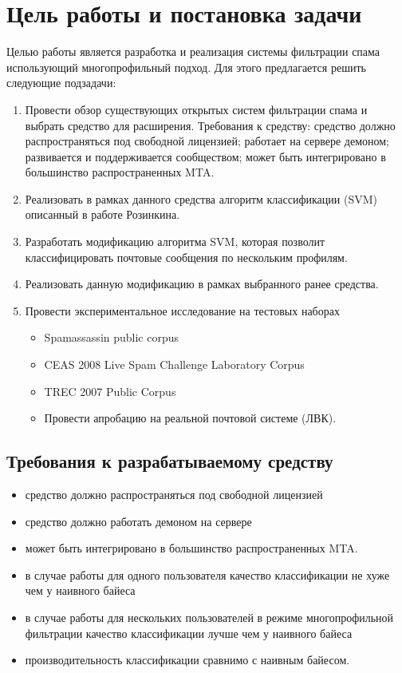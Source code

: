 \newpage
\section{Цель работы и постановка задачи}

Целью работы является разработка и реализация системы фильтрации спама использующий многопрофильный подход.
Для этого предлагается решить следующие подзадачи:
\begin{enumerate}
\item  Провести обзор существующих открытых систем фильтрации спама и выбрать средство для расширения. Требования к средству:
средство должно распространяться под свободной лицензией;
работает на сервере демоном;
развивается и поддерживается сообществом;
может быть интегрировано в большинство распространенных MTA.
\item Реализовать в рамках данного средства алгоритм классификации (SVM) описанный в работе Розинкина.
\item Разработать модификацию алгоритма SVM, которая позволит классифицировать почтовые сообщения по нескольким профилям.
\item Реализовать данную модификацию в рамках выбранного ранее средства.
\item Провести экспериментальное исследование на тестовых наборах
\begin{itemize}
    \item  Spamassassin public corpus
    \item CEAS 2008 Live Spam Challenge Laboratory Corpus
    \item TREC 2007 Public Corpus
    \item Провести апробацию на реальной почтовой системе (ЛВК).
\end{itemize}
\end{enumerate}


\subsection{Требования к разрабатываемому средству}
\begin{itemize}
\item средство должно распространяться под свободной лицензией
\item средство должно работать демоном на сервере
\item может быть интегрировано в большинство распространенных MTA.
\item в случае работы для одного пользователя качество классификации не хуже чем у наивного байеса
\item в случае работы для нескольких пользователей в режиме многопрофильной фильтрации качество классификации лучше чем у наивного байеса
\item производительность классификации сравнимо с наивным байесом.
\end{itemize}

